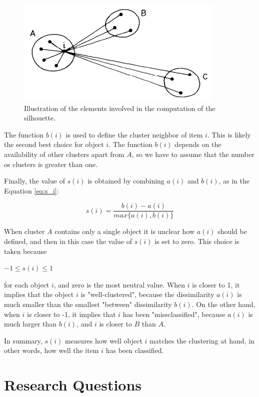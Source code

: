 \documentclass[journal]{IEEEtran}
\begin{document}
\begin{figure}[!htb]
	\centering
	\includegraphics[scale=.6]{figures/silhouette_img.png}
	\caption{Illustration of the elements involved in the computation of the silhouette. \cite{rousseeuw1987silhouettes}}
	\label{fig:silhouette}
\end{figure}

The function $b(i)$ is used to define the cluster neighbor of item $i$. This is likely the second best choice for object $i$. The function $b(i)$ depends on the availability of other clusters apart from $A$, so we have to assume that the number os clusters is greater than one.

Finally, the value of $s(i)$ is obtained by combining $a(i)$ and $b(i)$, as in the Equation \ref{eq:s_i}:

\begin{equation} \label{eq:s_i}
s(i) = \frac{b(i) - a(i)}{max\{a(i), b(i)\}}
\end{equation}

When cluster $A$ contains only a single object it is unclear how $a(i)$ should be defined, and then in this case the value of $s(i)$ is set to zero. This choice is taken because
\begin{center}
$-1 \le s(i) \le 1$
\end{center}

for each object $i$, and zero is the most neutral value. When $i$ is closer to 1, it implies that the object $i$ is "well-clustered", because the dissimilarity $a(i)$ is much smaller than the smallest "between" dissimilarity $b(i)$. On the other hand, when $i$ is closer to -1, it implies that $i$ has been "missclassified", because $a(i)$ is much larger than $b(i)$, and $i$ is closer to $B$ than $A$.

In summary, $s(i)$ measures how well object $i$ matches the clustering at hand, in other words, how well the item $i$ has been classified.

\section{Research Questions} \label{sec:research-questions}
\end{document}
